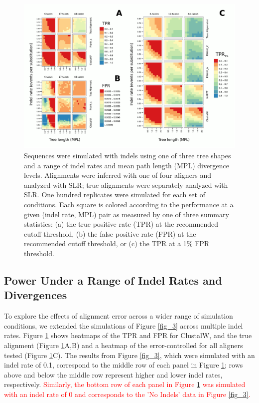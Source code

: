 \documentclass{article}
\begin{document}
\begin{figure}[t]
\begin{center}
\includegraphics[scale=0.8]{fig4.pdf}
\end{center}
\caption{Sequences were simulated with indels using one of three tree
  shapes and a range of indel rates and mean path length (MPL)
  divergence levels. Alignments were inferred with one of four
  aligners and analyzed with SLR; true alignments were separately
  analyzed with SLR. One hundred replicates were simulated for each
  set of conditions. Each square is colored according to the
  performance at a given (indel rate, MPL) pair as measured by one of
  three summary statistics: (a) the true positive rate (TPR) at the
  recommended cutoff threshold, (b) the false positive rate (FPR) at
  the recommended cutoff threshold, or (c) the TPR at a 1\% FPR
  threshold.}
\label{fig_4}
\end{figure}

\subsection*{\Sw Power Under a Range of Indel Rates and Divergences}

To explore the effects of alignment error across a wider range of
simulation conditions, we extended the simulations of Figure
\ref{fig_3} across multiple indel rates. Figure \ref{fig_4} shows
heatmaps of the TPR and FPR for ClustalW, \prankc and the true
alignment (Figure \ref{fig_4}A,B) and a heatmap of the
error-controlled \tpr for all aligners tested (Figure
\ref{fig_4}C). The results from Figure \ref{fig_3}, which were
simulated with an indel rate of 0.1, correspond to the middle row of
each panel in Figure \ref{fig_4}; rows above and below the middle row
represent higher and lower indel rates, respectively. \textcolor{red}{Similarly, the
bottom row of each panel in Figure \ref{fig_4} was simulated with an
indel rate of 0 and corresponds to the 'No Indels' data in Figure
\ref{fig_3}.}
\end{document}
